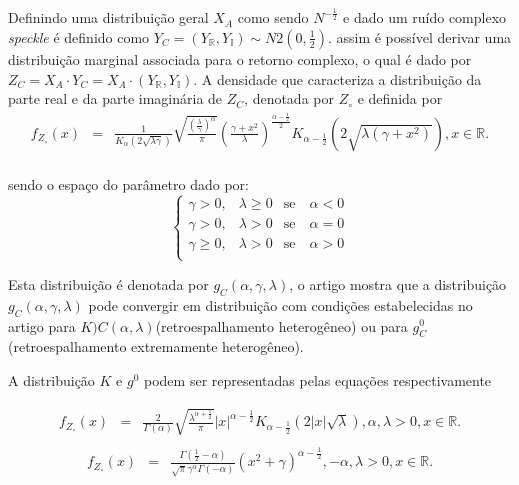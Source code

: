 \documentclass[10pt,a4paper]{article}
\begin{document}
Definindo uma distribuição geral $X_{A}$ como sendo $N^{-\frac{1}{2}}$ e dado um ruído complexo {\it speckle} é definido como $Y_{C}=(Y_{\mathbb{R}},Y_{\mathbb{I}})\sim N2(0,\frac{1}{2})$. assim é possível derivar uma distribuição marginal associada para o retorno complexo, o qual é dado por $Z_{C}=X_{A}\cdot Y_{C}=X_{
A}\cdot(Y_{\mathbb{R}},Y_{\mathbb{I}})$. A densidade que caracteriza a distribuição da parte real e da parte imaginária de $Z_{C}$, denotada por $Z_{\circ}$ e definida por
\begin{equation}\label{sec63eqn1}
\begin{array}{ccc}
	f_{Z_{\circ}}(x)&=&\frac{1}{K_{\alpha}(2\sqrt{\lambda\gamma})}\sqrt{\frac{\left(\frac{\lambda}{\gamma} \right)^{\alpha}}{\pi}}\left(\frac{\gamma+x^2}{\lambda} \right)^{\frac{\alpha-\frac{1}{2}}{2}}K_{\alpha-\frac{1}{2}}\left(2\sqrt{\lambda(\gamma+x^2)}\right), x\in\mathbb{R}. \\
\end{array}
\end{equation}

sendo o espaço do parâmetro dado por:
\begin{equation}\label{sec63eqn2}
	\left\{
\begin{array}{ccr}
	\gamma>0,&\lambda\geq 0&\mbox{se}\quad\alpha<0 \\
	\gamma>0,&\lambda > 0&\mbox{se}\quad\alpha=0 \\
	\gamma\geq0,&\lambda> 0&\mbox{se}\quad\alpha>0 \\
\end{array}
\right.
\end{equation}

Esta distribuição é denotada por $g_{C}(\alpha,\gamma,\lambda)$, o artigo mostra que a distribuição $g_{C}(\alpha,\gamma,\lambda)$ pode convergir em distribuição com condições estabelecidas no artigo para $K){C}(\alpha,\lambda)$(retroespalhamento heterogêneo) ou para $g_{C}^{0}$ (retroespalhamento extremamente heterogêneo).

A distribuição $K$ e $g^0$ podem ser representadas pelas equações respectivamente

\begin{equation}\label{sec63eqn3}
\begin{array}{ccc}
	f_{Z_{\circ}}(x)&=&\frac{2}{\Gamma(\alpha)}\sqrt{\frac{\lambda^{\alpha+\frac{1}{2}}}{\pi}} |x|^{\alpha-\frac{1}{2}}K_{\alpha-\frac{1}{2}}(2|x|\sqrt{\lambda}), \alpha,\lambda>0, x\in\mathbb{R}. \\
\end{array}
\end{equation}
\begin{equation}\label{sec63eqn4}
\begin{array}{ccc}
	f_{Z_{\circ}}(x)&=&\frac{\Gamma(\frac{1}{2}-\alpha)}{\sqrt{\pi}\gamma^{\alpha}\Gamma(-\alpha)}\left(x^2+\gamma\right)^{\alpha-\frac{1}{2}}, -\alpha,\lambda>0, x\in\mathbb{R}. \\
\end{array}
\end{equation}
\end{document}
